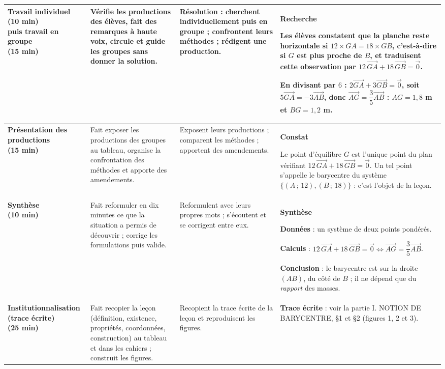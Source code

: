 \documentclass[10pt,a4paper]{article}
\providecommand{\hl}[1]{\colorbox{cHl}{#1}}                  %
\newcommand{\vc}[1]{\overrightarrow{#1}}                     %
\begin{document}
{\begin{longtable}{|L{3.0cm}|L{4.5cm}|L{3.5cm}|L{5.5cm}|}
\textbf{\color{cMeth}Travail individuel\newline(10 min)\newline puis travail en groupe\newline(15 min)}
& Vérifie les productions des élèves, fait des remarques à haute voix, circule et guide les groupes sans donner la solution.
& Résolution : cherchent individuellement puis en groupe ; confrontent leurs méthodes ; rédigent une production.
& \textbf{\color{cMeth}Recherche}\par
Les élèves constatent que la planche reste horizontale si $12\times GA=18\times GB$, c'est-à-dire si $G$ est plus proche de $B$, et traduisent cette observation par $12\,\vc{GA}+18\,\vc{GB}=\vc{0}$.\par
En divisant par $6$ : $2\vc{GA}+3\vc{GB}=\vc{0}$, soit $5\vc{GA}=-3\vc{AB}$, donc $\vc{AG}=\dfrac{3}{5}\vc{AB}$ : $AG=1{,}8$ m et $BG=1{,}2$ m.
\\\hline

\textbf{\color{cProp}Présentation des productions\newline(15 min)}
& Fait exposer les productions des groupes au tableau, organise la confrontation des méthodes et apporte des amendements.
& Exposent leurs productions ; comparent les méthodes ; apportent des amendements.
& \textbf{\color{cProp}Constat}\par
Le point d'équilibre $G$ est l'unique point du plan vérifiant $12\,\vc{GA}+18\,\vc{GB}=\vc{0}$. Un tel point s'appelle le \hl{barycentre} du système $\{(A\,;\,12),(B\,;\,18)\}$ : c'est l'objet de la leçon.
\\\hline

\textbf{\color{cProp}Synthèse\newline(10 min)}
& Fait reformuler en dix minutes ce que la situation a permis de découvrir ; corrige les formulations puis valide.
& Reformulent avec leurs propres mots ; s'écoutent et se corrigent entre eux.
& \textbf{\color{cProp}Synthèse}\par
\textbf{Données} : un système de deux points pondérés.\par
\textbf{Calculs} : $12\,\vc{GA}+18\,\vc{GB}=\vc{0}\Longleftrightarrow \vc{AG}=\dfrac{3}{5}\vc{AB}$.\par
\textbf{Conclusion} : le barycentre est sur la droite $(AB)$, du côté de $B$ ; il ne dépend que du \emph{rapport} des masses.
\\\hline

\textbf{\color{cDef}Institutionnalisation\newline(trace écrite)\newline(25 min)}
& Fait recopier la leçon (définition, existence, propriétés, coordonnées, construction) au tableau et dans les cahiers ; construit les figures.
& Recopient la trace écrite de la leçon et reproduisent les figures.
& \textbf{\color{cDef}Trace écrite} : voir la partie \textcolor{cPartie}{I. NOTION DE BARYCENTRE}, \S 1 et \S 2 (figures 1, 2 et 3).
\\\hline


\end{longtable}}
\end{document}
